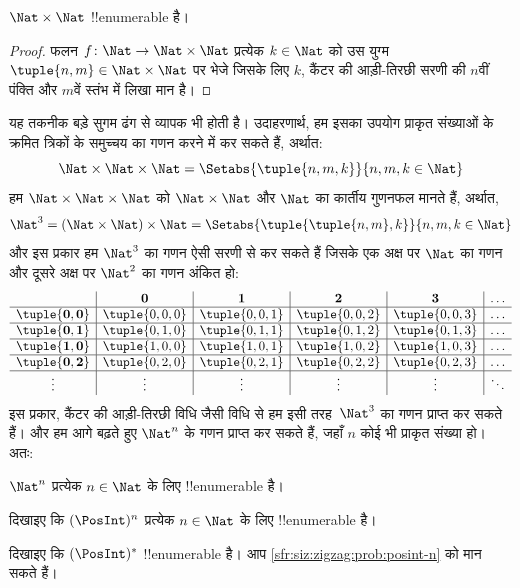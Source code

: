 \documentclass[../../../include/open-logic-section]{subfiles}
\begin{document}
\begin{prop}
$\Nat \times \Nat$ !!{enumerable} है।
\end{prop}

\begin{proof}
फलन $f \colon \Nat \to \Nat\times\Nat$ प्रत्येक $k \in \Nat$ को उस
युग्म $\tuple{n,m} \in \Nat \times \Nat$ पर भेजे जिसके लिए $k$, कैंटर की
आड़ी-तिरछी सरणी की $n$वीं पंक्ति और $m$वें स्तंभ में लिखा मान है। 
\end{proof}

\begin{explain}
यह तकनीक बड़े सुगम ढंग से व्यापक भी होती है। उदाहरणार्थ, हम इसका उपयोग प्राकृत
संख्याओं के क्रमित त्रिकों के समुच्चय का गणन करने में कर सकते हैं, अर्थात:
\[
\Nat \times \Nat \times \Nat = \Setabs{\tuple{n,m,k}}{n,m,k \in \Nat}
\]
हम $\Nat \times \Nat \times \Nat$ को $\Nat \times \Nat$ और $\Nat$ का
कार्तीय गुणनफल मानते हैं, अर्थात,
\[
\Nat^3 = (\Nat \times \Nat) \times \Nat =
\Setabs{\tuple{\tuple{n,m},k}}{n, m, k
  \in \Nat }
\]
और इस प्रकार हम $\Nat^3$ का गणन ऐसी सरणी से कर सकते हैं जिसके एक अक्ष पर
$\Nat$ का गणन और दूसरे अक्ष पर $\Nat^2$ का गणन अंकित हो:
\[
\begin{array}{ c | c | c | c | c | c}
& \mathbf 0 & \mathbf 1 & \mathbf 2 & \mathbf 3 & \dots \\
\hline
\mathbf{\tuple{0,0}} & \tuple{0,0,0} & \tuple{0,0,1} & \tuple{0,0,2} & \tuple{0,0,3} & \dots \\
\hline
\mathbf{\tuple{0,1}} & \tuple{0,1,0} & \tuple{0,1,1} & \tuple{0,1,2} & \tuple{0,1,3} & \dots \\
\hline
\mathbf{\tuple{1,0}} & \tuple{1,0,0} & \tuple{1,0,1} & \tuple{1,0,2} & \tuple{1,0,3} & \dots \\
\hline
\mathbf{\tuple{0,2}} & \tuple{0,2,0} & \tuple{0,2,1} & \tuple{0,2,2} & \tuple{0,2,3} & \dots\\
\hline
\vdots & \vdots & \vdots & \vdots & \vdots & \ddots \\
\end{array}
\]
इस प्रकार, कैंटर की आड़ी-तिरछी विधि जैसी विधि से हम इसी तरह~$\Nat^3$ का गणन
प्राप्त कर सकते हैं। और हम आगे बढ़ते हुए $\Nat^n$ के गणन प्राप्त कर सकते हैं,
जहाँ $n$ कोई भी प्राकृत संख्या हो। अतः:
\end{explain}

\begin{prop}
$\Nat^n$ प्रत्येक $n \in \Nat$ के लिए !!{enumerable} है।
\end{prop}

\begin{prob}\label{sfr:siz:zigzag:prob:posint-n}
दिखाइए कि $(\PosInt)^n$ प्रत्येक $n \in \Nat$ के लिए !!{enumerable} है।
\end{prob}

\begin{prob}\label{sfr:siz:zigzag:prob:posint-star}
  दिखाइए कि $(\PosInt)^*$ !!{enumerable} है। आप \cref{sfr:siz:zigzag:prob:posint-n}
  को मान सकते हैं।
\end{prob}
\end{document}
